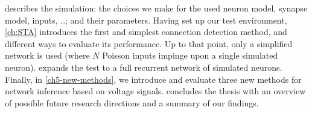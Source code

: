  describes the simulation: the choices we make for the used neuron model, synapse model, inputs, ..; and their parameters. Having set up our test environment, \cref{ch:STA} introduces the first and simplest connection detection method, and different ways to evaluate its performance. Up to that point, only a simplified network is used (where $N$ Poisson inputs impinge upon a single simulated neuron).  expands the test to a full recurrent network of simulated neurons. Finally, in \cref{ch5-new-methods}, we introduce and evaluate three new methods for network inference based on voltage signals.  concludes the thesis with an overview of possible future research directions and a summary of our findings.
